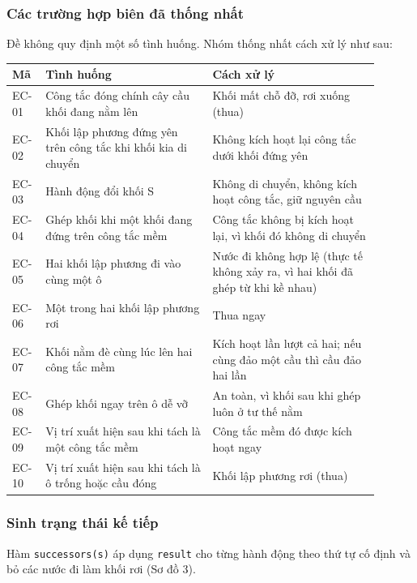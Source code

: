 \subsubsection{Các trường hợp biên đã thống nhất}

Đề không quy định một số tình huống. Nhóm thống nhất cách xử lý như sau:

{\renewcommand{\arraystretch}{1.25}
\begin{longtable}{|>{\centering\arraybackslash}p{0.068\linewidth}|>{\raggedright\arraybackslash}p{0.414\linewidth}|>{\raggedright\arraybackslash}p{0.414\linewidth}|}
\hline
\textbf{Mã} & \textbf{Tình huống} & \textbf{Cách xử lý} \\ \hline
\endhead
\hline
\endlastfoot
EC-01 & Công tắc đóng chính cây cầu khối đang nằm lên & Khối mất chỗ đỡ, rơi xuống (thua) \\ \hline
EC-02 & Khối lập phương đứng yên trên công tắc khi khối kia di chuyển & Không kích hoạt lại công tắc dưới khối đứng yên \\ \hline
EC-03 & Hành động đổi khối S & Không di chuyển, không kích hoạt công tắc, giữ nguyên cầu \\ \hline
EC-04 & Ghép khối khi một khối đang đứng trên công tắc mềm & Công tắc không bị kích hoạt lại, vì khối đó không di chuyển \\ \hline
EC-05 & Hai khối lập phương đi vào cùng một ô & Nước đi không hợp lệ (thực tế không xảy ra, vì hai khối đã ghép từ khi kề nhau) \\ \hline
EC-06 & Một trong hai khối lập phương rơi & Thua ngay \\ \hline
EC-07 & Khối nằm đè cùng lúc lên hai công tắc mềm & Kích hoạt lần lượt cả hai; nếu cùng đảo một cầu thì cầu đảo hai lần \\ \hline
EC-08 & Ghép khối ngay trên ô dễ vỡ & An toàn, vì khối sau khi ghép luôn ở tư thế nằm \\ \hline
EC-09 & Vị trí xuất hiện sau khi tách là một công tắc mềm & Công tắc mềm đó được kích hoạt ngay \\ \hline
EC-10 & Vị trí xuất hiện sau khi tách là ô trống hoặc cầu đóng & Khối lập phương rơi (thua) \\
\end{longtable}
}

\subsubsection{Sinh trạng thái kế tiếp}

Hàm \texttt{successors(s)} áp dụng \texttt{result} cho từng hành động theo thứ tự cố định và bỏ các nước đi làm khối rơi (Sơ đồ 3).

